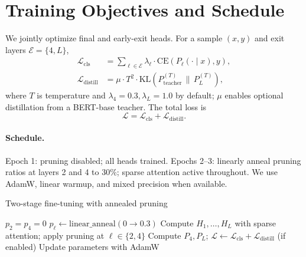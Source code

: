 \documentclass[11pt,letterpaper]{article}
\theoremstyle{plain}
\newcommand{\bert}{\textsc{BERT}}
\begin{document}
\section{Training Objectives and Schedule}
We jointly optimize final and early-exit heads. For a sample $(x,y)$ and exit layers $\mathcal{E}=\{4,L\}$,
\begin{align}
\mathcal{L}_{\text{cls}} &= \textstyle \sum_{\ell \in \mathcal{E}} \lambda_\ell \cdot \mathrm{CE}\!\left(P_\ell(\cdot \mid x), y\right), \\
\mathcal{L}_{\text{distill}} &= \mu \cdot T^2 \cdot \text{KL}\!\left(P_{\text{teacher}}^{(T)} \,\|\, P_{L}^{(T)}\right),
\end{align}
where $T$ is temperature and $\lambda_4{=}0.3,\lambda_L{=}1.0$ by default; $\mu$ enables optional distillation from a \bert{}-base teacher. The total loss is
\begin{equation}
\mathcal{L}=\mathcal{L}_{\text{cls}} + \mathcal{L}_{\text{distill}}.
\end{equation}

\paragraph{Schedule.} Epoch 1: pruning disabled; all heads trained. Epochs 2--3: linearly anneal pruning ratios at layers 2 and 4 to $30\%$; sparse attention active throughout. We use AdamW, linear warmup, and mixed precision when available.

\begin{algorithm}[t]
\caption{Two-stage fine-tuning with annealed pruning}
\label{alg:train}
\begin{algorithmic}[1]
   \State $p_2{=}p_4{=}0$ \Else \State $p_\ell \leftarrow \text{linear\_anneal}(0 \to 0.3)$ \EndIf
    \State Compute $H_1,\dots,H_L$ with sparse attention; apply pruning at $\ell\in\{2,4\}$
    \State Compute $P_4,P_L$; $\mathcal{L}\leftarrow \mathcal{L}_{\text{cls}} + \mathcal{L}_{\text{distill}}$ (if enabled)
    \State Update parameters with AdamW
  \EndFor
\EndFor
\end{algorithmic}
\end{algorithm}

\end{document}
